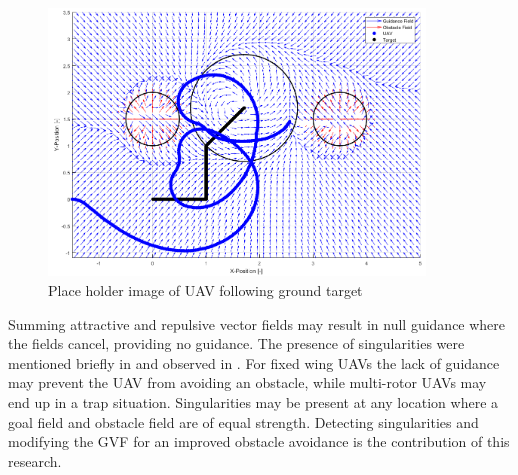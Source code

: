 \documentclass[numbered,pdftex]{ohio-etd}
\begin{document}
\begin{figure}[H]
	\centering
	\includegraphics[width=10cm]{PaperFigures/gvfMovingTarget}
	\caption{Place holder image of UAV following ground target \cite{wwc}}
	\label{fig:gvfMovingTarget}
\end{figure}

Summing attractive and repulsive vector fields may result in null guidance where the fields cancel, providing no guidance. The presence of singularities were mentioned briefly in \cite{nelson_cooperative_2005} and observed in \cite{panagou_motion_2014}. For fixed wing UAVs the lack of guidance may prevent the UAV from avoiding an obstacle, while multi-rotor UAVs may end up in a trap situation. Singularities may be present at any location where a goal field and obstacle field are of equal strength. Detecting singularities and modifying the GVF for an improved obstacle avoidance is the contribution of this research.
\end{document}
